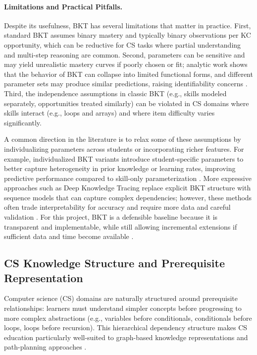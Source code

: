 \documentclass{article}
\begin{document}
\paragraph{Limitations and Practical Pitfalls.}
Despite its usefulness, BKT has several limitations that matter in practice. First, standard BKT assumes
binary mastery and typically binary observations per KC opportunity, which can be reductive for CS tasks
where partial understanding and multi-step reasoning are common. Second, parameters can be sensitive and
may yield unrealistic mastery curves if poorly chosen or fit; analytic work shows that the behavior of BKT
can collapse into limited functional forms, and different parameter sets may produce similar predictions,
raising identifiability concerns \cite{vandesande2013}. Third, the independence assumptions in classic BKT
(e.g., skills modeled separately, opportunities treated similarly) can be violated in CS domains where
skills interact (e.g., loops and arrays) and where item difficulty varies significantly.

A common direction in the literature is to relax some of these assumptions by individualizing parameters
across students or incorporating richer features. For example, individualized BKT variants introduce
student-specific parameters to better capture heterogeneity in prior knowledge or learning rates, improving
predictive performance compared to skill-only parameterization \cite{yudelson2013ibkt}. More expressive
approaches such as Deep Knowledge Tracing replace explicit BKT structure with sequence models that can capture
complex dependencies; however, these methods often trade interpretability for accuracy and require more data
and careful validation \cite{piech2015dkt}. For this project, BKT is a defensible baseline because it is
transparent and implementable, while still allowing incremental extensions if sufficient data and time become
available \cite{corbett1995,vandesande2013,yudelson2013ibkt}.


\subsection{CS Knowledge Structure and Prerequisite Representation}
\label{sec:background-prereqs}

Computer science (CS) domains are naturally structured around prerequisite
relationships: learners must understand simpler concepts before progressing to
more complex abstractions (e.g., variables before conditionals, conditionals
before loops, loops before recursion). This hierarchical dependency structure
makes CS education particularly well-suited to graph-based knowledge
representations and path-planning approaches \cite{koedinger2012,robins2003}.
\end{document}

